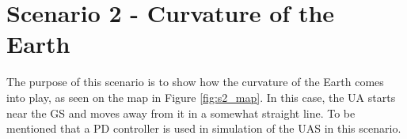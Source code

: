 \newpage
\section{Scenario 2 - Curvature of the Earth}\label{sec:scenario2}
The purpose of this scenario is to show how the curvature of the Earth comes into play, as seen on the map in Figure \ref{fig:s2_map}. In this case, the UA starts near the GS and moves away from it in a somewhat straight line. To be mentioned that a PD controller is used in simulation of the UAS in this scenario.

\begin{figure}[H]
	\centering

\end{figure}
